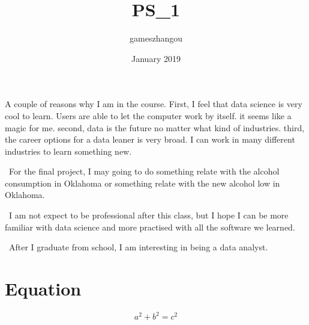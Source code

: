 \documentclass{article}
\title{PS_1}
\author{gameszhangou }
\date{January 2019}
\begin{document}
A couple of reasons why I am in the course. First, I feel that data science is very cool to learn. Users are able to let the computer work by itself. it seems like a magic for me. second, data is the future no matter what kind of industries. third, the career options for a data leaner is very broad. I can work in many different industries to learn something new.

\
For the final project, I may going to do something relate with the alcohol consumption in Oklahoma or something relate with the new alcohol low in Oklahoma.

\
I am not expect to be professional after this class, but I hope I can be more familiar with data science and more practised with all the software we learned. 

\
After I graduate from school, I am interesting in being a data analyst.  

\section{Equation}

\begin{equation}
a^2+b^2=c^2
\end{equation}
\end{document}
